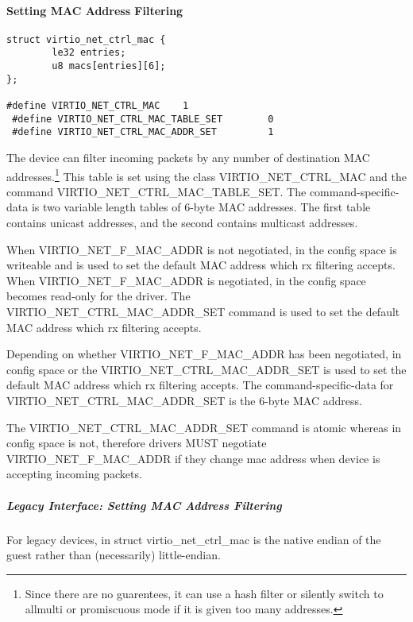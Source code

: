 \paragraph{Setting MAC Address Filtering}\label{sec:Device Types / Network Device / Device Operation / Control Virtqueue / Setting MAC Address Filtering}

\begin{lstlisting}
struct virtio_net_ctrl_mac {
        le32 entries;
        u8 macs[entries][6];
};

#define VIRTIO_NET_CTRL_MAC    1
 #define VIRTIO_NET_CTRL_MAC_TABLE_SET        0
 #define VIRTIO_NET_CTRL_MAC_ADDR_SET         1
\end{lstlisting}

The device can filter incoming packets by any number of destination
MAC addresses.\footnote{Since there are no guarentees, it can use a hash filter or
silently switch to allmulti or promiscuous mode if it is given too
many addresses.
} This table is set using the class
VIRTIO_NET_CTRL_MAC and the command VIRTIO_NET_CTRL_MAC_TABLE_SET. The
command-specific-data is two variable length tables of 6-byte MAC
addresses. The first table contains unicast addresses, and the second
contains multicast addresses.

When VIRTIO_NET_F_MAC_ADDR is not negotiated,  in the
config space is writeable and is used to set the default MAC
address which rx filtering accepts.
When VIRTIO_NET_F_MAC_ADDR is negotiated,  in the
config space becomes read-only for the driver.
The VIRTIO_NET_CTRL_MAC_ADDR_SET command is used to set the
default MAC address which rx filtering
accepts.

Depending on whether VIRTIO_NET_F_MAC_ADDR has been negotiated,
 in config space or the VIRTIO_NET_CTRL_MAC_ADDR_SET
is used to set the default MAC address which rx filtering
accepts.
The command-specific-data for VIRTIO_NET_CTRL_MAC_ADDR_SET is
the 6-byte MAC address.

The
VIRTIO_NET_CTRL_MAC_ADDR_SET command is atomic whereas
 in config space is not, therefore drivers
MUST negotiate VIRTIO_NET_F_MAC_ADDR if they change
mac address when device is accepting incoming packets.

\subparagraph{Legacy Interface: Setting MAC Address Filtering}\label{sec:Device Types / Network Device / Device Operation / Control Virtqueue / Setting MAC Address Filtering / Legacy Interface: Setting MAC Address Filtering}
For legacy devices,  in struct virtio_net_ctrl_mac is the
native endian of the guest rather than (necessarily) little-endian.


